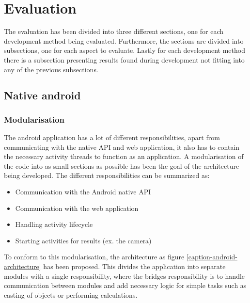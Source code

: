 \chapter{Evaluation}
The evaluation has been divided into three different sections, one for each development method being evaluated. Furthermore, the sections are divided into subsections, one for each aspect to evaluate. Lastly for each development method there is a subsection presenting results found during development not fitting into any of the previous subsections. 
\section{Native android} \label{android}
\subsection{Modularisation}
The android application has a lot of different responsibilities, apart from communicating with the native API and web application, it also has to contain the necessary activity threads to function as an application. A modularisation of the code into as small sections as possible has been the goal of the architecture being developed. The different responsibilities can be summarized as:

\begin{itemize}
\item Communication with the Android native API
\item Communication with the web application
\item Handling activity lifecycle
\item Starting activities for results (ex. the camera)
\end{itemize}


To conform to this modularisation, the architecture as figure \ref{caption-android-architecture} has been proposed. This divides the application into separate modules with a single responsibility, where the bridges responsibility is to handle communication between modules and add necessary logic for simple tasks such as casting of objects or performing calculations. 

